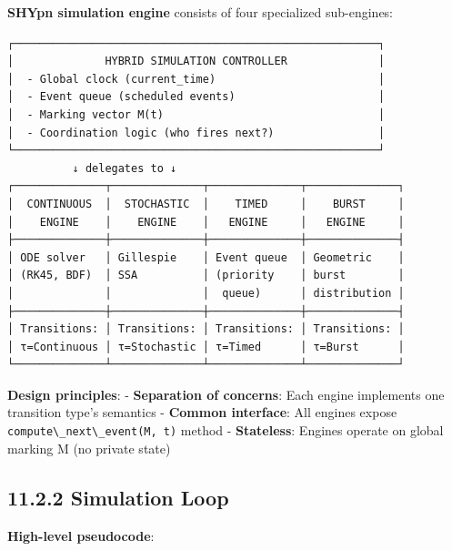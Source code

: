 \textbf{SHYpn simulation engine} consists of four specialized
sub-engines:

\begin{lstlisting}
┌────────────────────────────────────────────────────────┐
│              HYBRID SIMULATION CONTROLLER              │
│  - Global clock (current_time)                         │
│  - Event queue (scheduled events)                      │
│  - Marking vector M(t)                                 │
│  - Coordination logic (who fires next?)                │
└────────────────────────────────────────────────────────┘
          ↓ delegates to ↓
┌──────────────┬──────────────┬──────────────┬──────────────┐
│  CONTINUOUS  │  STOCHASTIC  │    TIMED     │    BURST     │
│    ENGINE    │    ENGINE    │   ENGINE     │   ENGINE     │
├──────────────┼──────────────┼──────────────┼──────────────┤
│ ODE solver   │ Gillespie    │ Event queue  │ Geometric    │
│ (RK45, BDF)  │ SSA          │ (priority    │ burst        │
│              │              │  queue)      │ distribution │
├──────────────┼──────────────┼──────────────┼──────────────┤
│ Transitions: │ Transitions: │ Transitions: │ Transitions: │
│ τ=Continuous │ τ=Stochastic │ τ=Timed      │ τ=Burst      │
└──────────────┴──────────────┴──────────────┴──────────────┘
\end{lstlisting}

\textbf{Design principles}: - \textbf{Separation of concerns}: Each
engine implements one transition type's semantics - \textbf{Common
interface}: All engines expose
\passthrough{\lstinline!compute\_next\_event(M, t)!} method -
\textbf{Stateless}: Engines operate on global marking M (no private
state)

\hypertarget{simulation-loop}{%
\subsection{11.2.2 Simulation Loop}\label{simulation-loop}}

\textbf{High-level pseudocode}:

